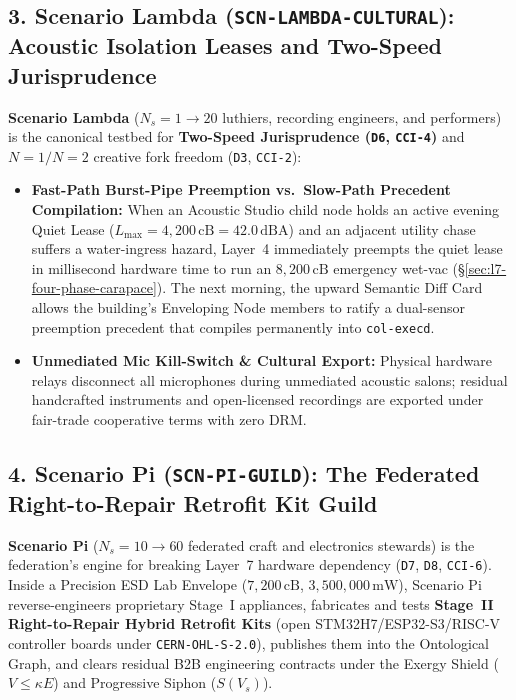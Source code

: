 \subsection{3. Scenario Lambda (\texttt{SCN-LAMBDA-CULTURAL}): Acoustic Isolation Leases and Two-Speed Jurisprudence}
\textbf{Scenario Lambda} ($N_s = 1 \to 20$ luthiers, recording engineers, and performers) is the canonical testbed for \textbf{Two-Speed Jurisprudence (\texttt{D6}, \texttt{CCI-4})} and $N=1 / N=2$ creative fork freedom (\texttt{D3}, \texttt{CCI-2}):
\begin{itemize}
    \item \textbf{Fast-Path Burst-Pipe Preemption vs.\ Slow-Path Precedent Compilation:} When an Acoustic Studio child node holds an active evening Quiet Lease ($L_{\max} = 4{,}200\,\mathrm{cB} = 42.0\,\mathrm{dBA}$) and an adjacent utility chase suffers a water-ingress hazard, Layer~4 immediately preempts the quiet lease in millisecond hardware time to run an $8{,}200\,\mathrm{cB}$ emergency wet-vac (\S\ref{sec:l7-four-phase-carapace}). The next morning, the upward Semantic Diff Card allows the building's Enveloping Node members to ratify a dual-sensor preemption precedent that compiles permanently into \texttt{col-execd}.
    \item \textbf{Unmediated Mic Kill-Switch \& Cultural Export:} Physical hardware relays disconnect all microphones during unmediated acoustic salons; residual handcrafted instruments and open-licensed recordings are exported under fair-trade cooperative terms with zero DRM.
\end{itemize}

\subsection{4. Scenario Pi (\texttt{SCN-PI-GUILD}): The Federated Right-to-Repair Retrofit Kit Guild}
\textbf{Scenario Pi} ($N_s = 10 \to 60$ federated craft and electronics stewards) is the federation's engine for breaking Layer~7 hardware dependency (\texttt{D7}, \texttt{D8}, \texttt{CCI-6}). Inside a Precision ESD Lab Envelope ($7{,}200\,\mathrm{cB}$, $3{,}500{,}000\,\mathrm{mW}$), Scenario Pi reverse-engineers proprietary Stage~I appliances, fabricates and tests \textbf{Stage~II Right-to-Repair Hybrid Retrofit Kits} (open STM32H7/ESP32-S3/RISC-V controller boards under \texttt{CERN-OHL-S-2.0}), publishes them into the Ontological Graph, and clears residual B2B engineering contracts under the Exergy Shield ($V \le \kappa E$) and Progressive Siphon ($S(V_s)$).

